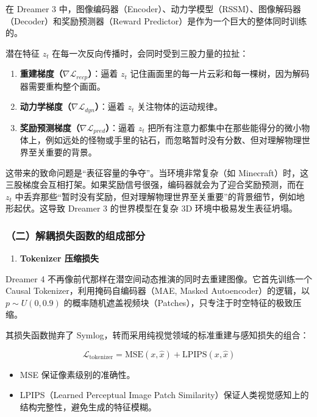 在 Dreamer 3 中，图像编码器（Encoder）、动力学模型（RSSM）、图像解码器（Decoder）和奖励预测器（Reward Predictor）是作为一个巨大的整体同时训练的。

潜在特征 \(z_t\) 在每一次反向传播时，会同时受到三股力量的拉扯：

\begin{enumerate}
\def\labelenumi{\arabic{enumi}.}
\tightlist
\item
  \textbf{重建梯度（\(\nabla \mathcal{L}_{recp}\)）}：逼着 \(z_t\) 记住画面里的每一片云彩和每一棵树，因为解码器需要重构整个画面。
\item
  \textbf{动力学梯度（\(\nabla \mathcal{L}_{dyn}\)）}：逼着 \(z_t\) 关注物体的运动规律。
\item
  \textbf{奖励预测梯度（\(\nabla \mathcal{L}_{pred}\)）}：逼着 \(z_t\) 把所有注意力都集中在那些能得分的微小物体上，例如远处的怪物或手里的钻石，而忽略暂时没有分数、但对理解物理世界至关重要的背景。
\end{enumerate}

这带来的致命问题是``表征容量的争夺''。当环境非常复杂（如 Minecraft）时，这三股梯度会互相打架。如果奖励信号很强，编码器就会为了迎合奖励预测，而在 \(z_t\) 中丢弃那些``暂时没有奖励，但对理解物理世界至关重要''的背景细节，例如地形起伏。这导致 Dreamer 3 的世界模型在复杂 3D 环境中极易发生表征坍塌。

\hypertarget{ux4e8cux89e3ux8026ux635fux5931ux51fdux6570ux7684ux7ec4ux6210ux90e8ux5206}{%
\subsubsection{（二）解耦损失函数的组成部分}\label{ux4e8cux89e3ux8026ux635fux5931ux51fdux6570ux7684ux7ec4ux6210ux90e8ux5206}}

\begin{enumerate}
\def\labelenumi{\arabic{enumi}.}
\tightlist
\item
  \textbf{Tokenizer 压缩损失}
\end{enumerate}

Dreamer 4 不再像前代那样在潜空间动态推演的同时去重建图像。它首先训练一个 Causal Tokenizer，利用掩码自编码器（MAE, Masked Autoencoder）的逻辑，以 \(p \sim U(0, 0.9)\) 的概率随机遮盖视频块（Patches），只专注于时空特征的极致压缩。

其损失函数抛弃了 Symlog，转而采用纯视觉领域的标准重建与感知损失的组合：

\[
\mathcal{L}_{\mathrm{tokenizer}}
=
\mathrm{MSE}(x, \hat{x})
+
\mathrm{LPIPS}(x, \hat{x})
\]

\begin{itemize}
\tightlist
\item
  MSE 保证像素级别的准确性。
\item
  LPIPS（Learned Perceptual Image Patch Similarity）保证人类视觉感知上的结构完整性，避免生成的特征模糊。
\end{itemize}

